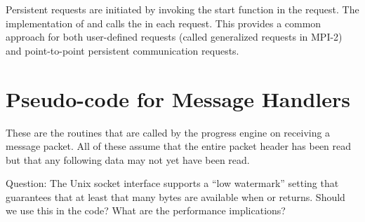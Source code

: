\documentclass{article}
\begin{document}

Persistent requests are initiated by invoking the start function in
the request.  The implementation of  and
 calls the  in each request.  This
provides a common approach for both user-defined requests (called
generalized requests in MPI-2) and point-to-point persistent
communication requests.

\section{Pseudo-code for Message Handlers}
\label{sec:handlers}
\label{sec:agent}
These are the routines that are called by the progress engine on receiving a
message packet.  All of these assume that the entire packet header has been 
read but that any following data may not yet have been read.  

Question: The Unix socket interface supports a ``low watermark''
setting that guarantees that at least that many bytes are available
when  or  returns.  Should we use this in the
code?  What are the performance implications?
\end{document}
